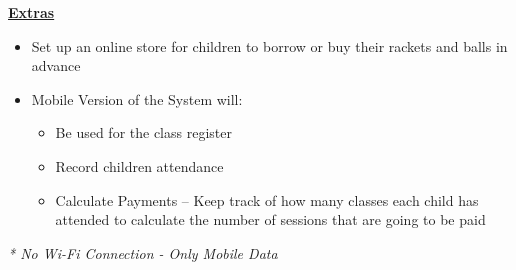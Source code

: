 \documentclass{l3proj}
\begin{document}
\textbf{\underline{Extras}}
	\begin{itemize}
		\item Set up an online store for children to borrow or buy their rackets and balls in advance
		\item Mobile Version of the System will:
		\begin{itemize}
			\item Be used for the class register
			\item Record children attendance
			\item Calculate Payments -- Keep track of how many classes each child has attended to calculate the number of sessions that are going to be paid
		\end{itemize}
	\end{itemize}
\emph{* No Wi-Fi Connection - Only Mobile Data}\\
\noindent\makebox[\linewidth]{\rule{\paperwidth}{0.4pt}}



\end{document}
